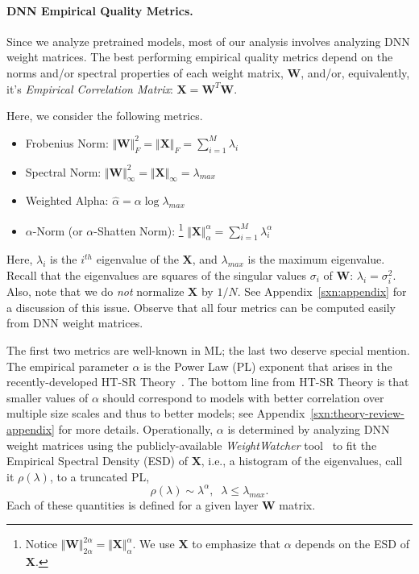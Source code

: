 \paragraph{DNN Empirical Quality Metrics.}

Since we analyze pretrained models, most of our analysis involves analyzing DNN weight matrices.
The best performing empirical quality metrics depend on the norms and/or spectral properties of each weight matrix,
$\mathbf{W}$, and/or, equivalently, it's \emph{Empirical Correlation Matrix}: $\mathbf{X}=\mathbf{W}^{T}\mathbf{W}$.%

Here, we consider the following metrics.

\begin{itemize}
\item 
Frobenius Norm: $\Vert\mathbf{W}\Vert^{2}_{F}=\Vert\mathbf{X}\Vert_{F}=\sum_{i=1}^{M} \lambda_{i}$
\item 
Spectral Norm: $\Vert\mathbf{W}\Vert_{\infty}^{2}=\Vert\mathbf{X}\Vert_{\infty}=\lambda_{max}$
\item 
Weighted Alpha: $\hat{\alpha}=\alpha\log\lambda_{max}$
\item 
$\alpha$-Norm (or $\alpha$-Shatten Norm):%
\footnote{Notice $\Vert\mathbf{W}\Vert^{2\alpha}_{2\alpha}=\Vert\mathbf{X}\Vert^{\alpha}_{\alpha}$. We use $\mathbf{X}$ to emphasize that $\alpha$ depends on the ESD of $\mathbf{X}$.}
 $\Vert\mathbf{X}\Vert^{\alpha}_{\alpha}=\sum_{i=1}^{M}\lambda_{i}^{\alpha}$
\end{itemize}
Here, $\lambda_{i}$ is the $i^{th}$ eigenvalue of the $\mathbf{X}$, and $\lambda_{max}$ is the maximum eigenvalue.
Recall that the eigenvalues are squares of the singular values $\sigma_{i}$ of $\mathbf{W}$: $\lambda_{i}=\sigma^{2}_{i}$.
Also, note that we do \emph{not} normalize $\mathbf{X}$ by $1/N$.
See Appendix~\ref{sxn:appendix} for a discussion of this issue.
Observe that all four metrics can be computed easily from DNN weight matrices.

The first two metrics are well-known in ML; the last two deserve special mention.
The empirical parameter $\alpha$ is the Power Law (PL) exponent that arises in the recently-developed HT-SR Theory~\cite{MM18_TR, MM19_HTSR_ICML, MM20_SDM}.
The bottom line from HT-SR Theory is that smaller values of $\alpha$ should correspond to models with better correlation over multiple size scales and thus to better models; see Appendix~\ref{sxn:theory-review-appendix} for more details.
Operationally, $\alpha$ is determined by analyzing DNN weight matrices using the publicly-available \emph{WeightWatcher} tool~\cite{weightwatcher_package} to fit the Empirical Spectral Density (ESD) of $\mathbf{X}$, i.e., a histogram of the eigenvalues, call it $\rho(\lambda)$, to a truncated PL, 
\begin{equation}
\rho(\lambda)\sim\lambda^{\alpha},\;\;\lambda\le\lambda_{max}.
\end{equation}
Each of these quantities is defined for a given layer $\mathbf{W}$ matrix.

